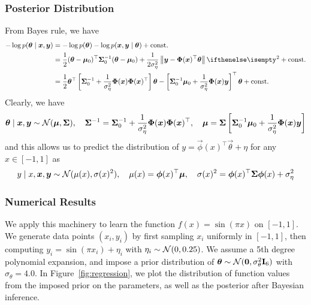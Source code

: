 \subsubsection{Posterior Distribution}

From Bayes rule, we have
\begin{equation}
  \begin{split}
    -\log p(\Vec{\theta} \mid \Vec{x}, \Vec{y})
    &= -\log p(\Vec{\theta}) - \log p(\Vec{x}, \Vec{y} \mid \Vec{\theta}) +
    \text{const.} \\
    &= \frac{1}{2} (\Vec{\theta} - \Vec{\mu}_0)^\top \Mat{\Sigma}_0^{-1}
    (\Vec{\theta} - \Vec{\mu}_0) + \frac{1}{2 \sigma_\eta^2} \Norm{\Vec{y} -
    \Mat{\Phi}(\Vec{x})^\top \Vec{\theta}}^2 + \text{const.} \\
    &= \frac{1}{2} \Vec{\theta}^\top \left[\Mat{\Sigma}_0^{-1} +
    \frac{1}{\sigma_\eta^2} \Mat{\Phi}(\Vec{x}) \Mat{\Phi}(\Vec{x})^\top\right]
    \Vec{\theta} - \left[\Mat{\Sigma}_0^{-1} \Vec{\mu}_0 +
    \frac{1}{\sigma_\eta^2} \Mat{\Phi}(\Vec{x}) \Vec{y}\right]^\top \Vec{\theta}
    + \text{const.}
  \end{split}
\end{equation}
Clearly, we have
\begin{equation}
  \bm{\theta} \mid \bm{x}, \bm{y} \sim \mathcal{N}(\bm{\mu}, \mathbf{\Sigma}),
  \quad
  \mathbf{\Sigma}^{-1} = \mathbf{\Sigma}_0^{-1} + \frac{1}{\sigma_\eta^2}
  \mathbf{\Phi}(\bm{x}) \mathbf{\Phi}(\bm{x})^\top,
  \quad
  \bm{\mu} = \mathbf{\Sigma} \left[\mathbf{\Sigma}_0^{-1} \bm{\mu}_0 +
  \frac{1}{\sigma_\eta^2} \mathbf{\Phi}(\bm{x}) \bm{y}\right]
\end{equation}
and this allows us to predict the distribution of $y = \Vec{\phi}(x)^\top
\Vec{\theta} + \eta$ for any $x \in [-1, 1]$ as
\begin{equation}
  y \mid x, \bm{x}, \bm{y} \sim \mathcal{N}(\mu(x), \sigma(x)^2), \quad \mu(x)
  = \bm{\phi}(x)^\top \bm{\mu}, \quad \sigma(x)^2 = \bm{\phi}(x)^\top
  \mathbf{\Sigma} \bm{\phi}(x) + \sigma_\eta^2
\end{equation}

\subsubsection{Numerical Results}

We apply this machinery to learn the function $f(x) = \sin(\pi x)$ on $[-1, 1]$.
We generate data points $(x_i, y_i)$ by first sampling $x_i$ uniformly in $[-1,
1]$, then computing $y_i = \sin(\pi x_i) + \eta_i$ with $\eta_i \sim
\mathcal{N}(0, 0.25)$. We assume a 5th degree polynomial expansion, and impose a
prior distribution of $\bm{\theta} \sim \mathcal{N}(\bm{0}, \sigma_\theta^2
\mathbf{I}_6)$ with $\sigma_\theta = 4.0$.  In Figure~\ref{fig:regression}, we plot
the distribution of function values from the imposed prior on the parameters, as
well as the posterior after Bayesian inference.

